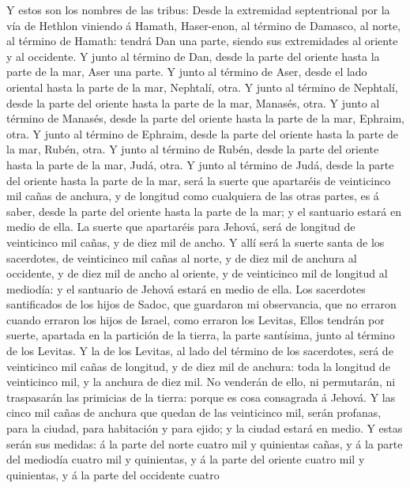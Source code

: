  Y estos son los nombres de las tribus: Desde la extremidad
septentrional por la vía de Hethlon viniendo á Hamath, Haser-enon, al
término de Damasco, al norte, al término de Hamath: tendrá Dan una
parte, siendo sus extremidades al oriente y al occidente.  Y
junto al término de Dan, desde la parte del oriente hasta la parte de la
mar, Aser una parte.  Y junto al término de Aser, desde el
lado oriental hasta la parte de la mar, Nephtalí, otra.  Y
junto al término de Nephtalí, desde la parte del oriente hasta la parte
de la mar, Manasés, otra.  Y junto al término de Manasés,
desde la parte del oriente hasta la parte de la mar, Ephraim, otra.
 Y junto al término de Ephraim, desde la parte del oriente
hasta la parte de la mar, Rubén, otra.  Y junto al término
de Rubén, desde la parte del oriente hasta la parte de la mar, Judá,
otra.  Y junto al término de Judá, desde la parte del
oriente hasta la parte de la mar, será la suerte que apartaréis de
veinticinco mil cañas de anchura, y de longitud como cualquiera de las
otras partes, es á saber, desde la parte del oriente hasta la parte de
la mar; y el santuario estará en medio de ella.  La suerte
que apartaréis para Jehová, será de longitud de veinticinco mil cañas, y
de diez mil de ancho.  Y allí será la suerte santa de los
sacerdotes, de veinticinco mil cañas al norte, y de diez mil de anchura
al occidente, y de diez mil de ancho al oriente, y de veinticinco mil de
longitud al mediodía: y el santuario de Jehová estará en medio de ella.
 Los sacerdotes santificados de los hijos de Sadoc, que
guardaron mi observancia, que no erraron cuando erraron los hijos de
Israel, como erraron los Levitas,  Ellos tendrán por
suerte, apartada en la partición de la tierra, la parte santísima, junto
al término de los Levitas.  Y la de los Levitas, al lado
del término de los sacerdotes, será de veinticinco mil cañas de
longitud, y de diez mil de anchura: toda la longitud de veinticinco mil,
y la anchura de diez mil.  No venderán de ello, ni
permutarán, ni traspasarán las primicias de la tierra: porque es cosa
consagrada á Jehová.  Y las cinco mil cañas de anchura que
quedan de las veinticinco mil, serán profanas, para la ciudad, para
habitación y para ejido; y la ciudad estará en medio.  Y
estas serán sus medidas: á la parte del norte cuatro mil y quinientas
cañas, y á la parte del mediodía cuatro mil y quinientas, y á la parte
del oriente cuatro mil y quinientas, y á la parte del occidente cuatro
